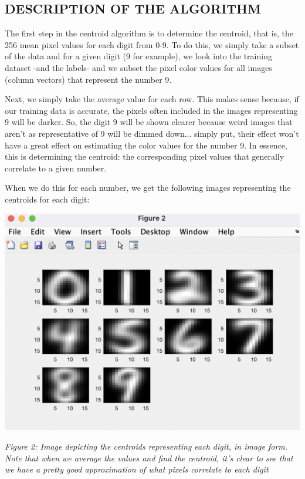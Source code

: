 \documentclass[dvipsnames,12pt]{article} %
\begin{document}
      \subsection{DESCRIPTION OF THE ALGORITHM}
        \label{SUBSECT 3.1:CENTROID DESCRIPTION}

        \hskip 12pt The first step in the centroid algorithm is to determine the centroid, that is, the 256 mean pixel values for each digit from 0-9. To do this, we simply take a subset of the data and for a given digit (9 for example), we look into the training dataset -and the labels- and we subset the pixel color values for all images (column vectors) that represent the number 9.

        \vskip 06pt

        \hskip 12pt Next, we simply take the average value for each row. This makes sense because, if our training data is accurate, the pixels often included in the images representing 9 will be darker. So, the digit 9 will be shown clearer because weird images that aren't as representative of 9 will be dimmed down... simply put, their effect won't have a great effect on estimating the color values for the number 9. In essence, this is determining the centroid: the corresponding pixel values that generally correlate to a given number.

        \vskip 06pt

        \hskip 12pt When we do this for each number, we get the following images representing the centroids for each digit:

        \begin{center}
            \includegraphics[scale=0.8]{Images/MAT 167 FPP Fig 2.png}
            
            \textit{Figure 2: Image depicting the centroids representing each digit, in image form. Note that when we average the values and find the centroid, it's clear to see that we have a pretty good approximation of what pixels correlate to each digit}
        \end{center}
\end{document}
